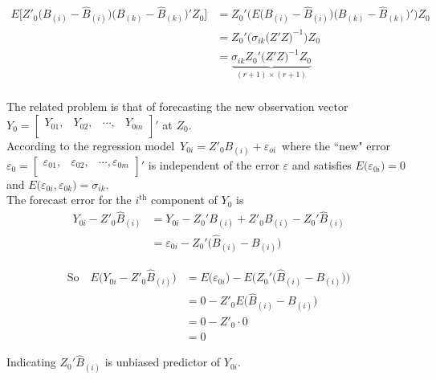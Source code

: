 \documentclass[11pt,a4paper]{article}
\theoremstyle{definition}
\begin{document}
\begin{align*}
E\big[Z'_0\big(B_{(i)}-\widehat{B}_{(i)}\big)\big(B_{(k)}-\widehat{B}_{(k)}\big)'Z_0\big] & = Z_0'\big(E\big(B_{(i)}-\widehat{B}_{(i)}\big)\big(B_{(k)}-\widehat{B}_{(k)}\big)'\big)Z_0\\
& = Z_0'\big(\sigma_{ik}\big(Z'Z\big)^{-1}\big)Z_0\\
& = \underbrace{\sigma_{ik}Z_0'\big(Z'Z\big)^{-1}Z_0}_{(r+1)\times (r+1)}\tag{12}\\
\end{align*}




The related problem is that of forecasting the new observation vector $Y_0 =
\begin{bmatrix}
Y_{01}, & Y_{02}, & \cdots, & Y_{0m}\\
\end{bmatrix}'
$ at $Z_0$.\\

According to the regression model $\, Y_{0i} = Z'_{0}B_{(i)} + \varepsilon_{oi}\,$ where the ``new" error\\ $\varepsilon_0 = 
\begin{bmatrix}
\varepsilon_{01},& \varepsilon_{02}, & \cdots, \varepsilon_{0m}\\
\end{bmatrix}'$ is independent of the error $\varepsilon$ and satisfies $E\big(\varepsilon_{0i}\big)=0$ and $E\big(\varepsilon_{0i},\varepsilon_{0k}\big)=\sigma_{ik}$.\\


The forecast error for the $i^{\text{th}}$ component of $Y_0$ is 
\begin{align*}
Y_{0i} - Z'_0\widehat{B}_{(i)} &  = Y_{0i} - Z_0'B_{(i)} + Z'_{0}B_{(i)} - Z_0'\widehat{B}_{(i)}\\
                           & = \varepsilon_{0i} - Z_0'\big(\widehat{B}_{(i)}-B_{(i)}\big)
\end{align*}


\begin{align*}
\text{So}\quad  E\big(Y_{0i}-Z'_0\widehat{B}_{(i)}\big) & = E\big(\varepsilon_{0i}\big)-E\big(Z_0'\big(\widehat{B}_{(i)}-B_{(i)}\big)\big)\\
& = 0 - Z'_0 E\big(\widehat{B}_{(i)}-B_{(i)}\big)\\
& = 0- Z'_0\cdot 0\\
& = 0
\end{align*}

Indicating $Z_0'\widehat{B}_{(i)}$ is unbiased predictor of $Y_{0i}$.\\
\end{document}
